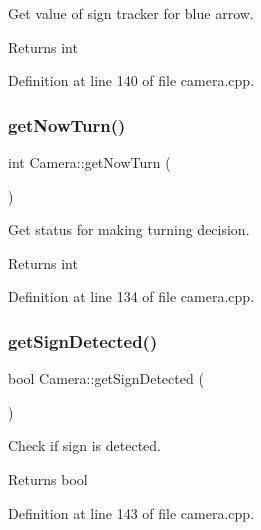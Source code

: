 Get value of sign tracker for blue arrow. 

\begin{DoxyReturn}{Returns}
int 
\end{DoxyReturn}


Definition at line 140 of file camera.\+cpp.

\mbox{\label{class_camera_a6b27e3016f42ac8af96601426e009c1b}} 
\subsubsection{\texorpdfstring{get\+Now\+Turn()}{getNowTurn()}}
{\footnotesize\ttfamily int Camera\+::get\+Now\+Turn (\begin{DoxyParamCaption}{ }\end{DoxyParamCaption})}



Get status for making turning decision. 

\begin{DoxyReturn}{Returns}
int 
\end{DoxyReturn}


Definition at line 134 of file camera.\+cpp.

\mbox{\label{class_camera_a0f8951959a2822e6b729a9fe05b428ef}} 
\subsubsection{\texorpdfstring{get\+Sign\+Detected()}{getSignDetected()}}
{\footnotesize\ttfamily bool Camera\+::get\+Sign\+Detected (\begin{DoxyParamCaption}{ }\end{DoxyParamCaption})}



Check if sign is detected. 

\begin{DoxyReturn}{Returns}
bool 
\end{DoxyReturn}


Definition at line 143 of file camera.\+cpp.

\mbox{\label{class_camera_a476073362ca2d7f38cfc4662aeeafb0e}} 
